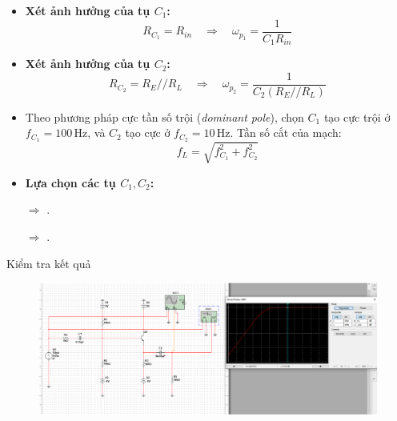 
\begin{itemize}[label=-, leftmargin=2cm]
	\item \textbf{Xét ảnh hưởng của tụ \( C_1 \):}
	\[
	R_{C_1} = R_{in}
	\quad \Longrightarrow \quad
	\omega_{p_1} = \frac{1}{C_1 R_{in}}
	\]
	
	\item \textbf{Xét ảnh hưởng của tụ \( C_2 \):}
	\[
	R_{C_2} = R_E // R_L
	\quad \Longrightarrow \quad
	\omega_{p_2} = \frac{1}{C_2 (R_E // R_L)}
	\]
	
	\item Theo phương pháp cực tần số trội (\emph{dominant pole}), chọn \( C_1 \) tạo cực trội ở 
	\( f_{C_1} = 100\,\text{Hz} \), 
	và \( C_2 \) tạo cực ở \( f_{C_2} = 10\,\text{Hz} \).  
	Tần số cắt của mạch:
	\[
	f_L = \sqrt{f_{C_1}^2 + f_{C_2}^2}
	\]
	
	\item \textbf{Lựa chọn các tụ \( C_1, C_2 \):}
	
	$\Rightarrow$ .
	
	$\Rightarrow$ .
\end{itemize}

Kiểm tra kết quả

\begin{figure}[H]
	\centering
	\includegraphics[width=.9\linewidth]{./my-chapters/my-images/Question3/d_ketqua.png}
\end{figure}

